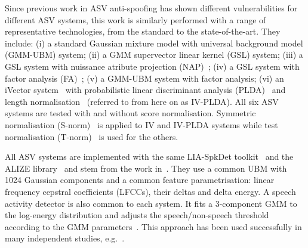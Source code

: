 
Since previous work in ASV anti-spoofing has shown different vulnerabilities for different ASV systems, this work is similarly performed with a range of representative technologies, from the standard to the state-of-the-art.
They include: 
(i) a standard Gaussian mixture model with universal background model (GMM-UBM) system;
(ii) a GMM supervector linear kernel (GSL) system;
(iii) a GSL system with nuissance atribute projection (NAP)~\cite{Campbell2006};
(iv) a GSL system with factor analysis (FA)~\cite{Fauve2007};
(v) a GMM-UBM system with factor analysis;
(vi) an iVector system~\cite{Dehak2011} with probabilistic linear discriminant analysis (PLDA)~\cite{Li2012} and length normalisation~\cite{Garcia2011} (referred to from here on as IV-PLDA). 
All %
six ASV systems are tested with and without score normalisation.  
Symmetric normalisation (S-norm)~\cite{Kenny2010} is applied to IV and IV-PLDA systems while test normalisation (T-norm)~\cite{Auckenthaler2000} is used for the others. 

All ASV systems are implemented with the same LIA-SpkDet toolkit~\cite{Bonastre2008} and the ALIZE library~\cite{Bonastre2004} and stem from the work in~\cite{Fauve2007}.
They use a common UBM with 1024 Gaussian components and a common feature parametrisation: linear frequency cepstral coefficients (LFCCs), their deltas and delta energy. 
A speech activity detector is also common to each system.  
It fits a 3-component GMM to the log-energy distribution and adjusts the speech/non-speech threshold according to the GMM parameters~\cite{Bimbot2004}.
This approach has been used successfully in many independent studies, e.g.~\cite{magrin2001,fauve2008}. 
